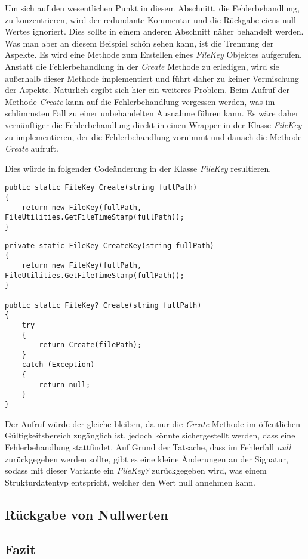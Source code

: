 Um sich auf den wesentlichen Punkt in diesem Abschnitt, die Fehlerbehandlung, zu konzentrieren, wird der redundante Kommentar und die Rückgabe eiens null-Wertes ignoriert. Dies sollte in einem anderen Abschnitt näher behandelt werden. %
Was man aber an diesem Beispiel schön sehen kann, ist die Trennung der Aspekte. Es wird eine Methode zum Erstellen eines \textit{FileKey} Objektes aufgerufen. Anstatt die Fehlerbehandlung in der \textit{Create} Methode zu erledigen, wird sie außerhalb dieser Methode implementiert und führt daher zu keiner Vermischung der Aspekte. Natürlich ergibt sich hier ein weiteres Problem. Beim Aufruf der Methode \textit{Create} kann auf die Fehlerbehandlung vergessen werden, was im schlimmsten Fall zu einer unbehandelten Ausnahme führen kann. Es wäre daher vernünftiger die Fehlerbehandlung direkt in einen Wrapper in der Klasse \textit{FileKey} zu implementieren, der die Fehlerbehandlung vornimmt und danach die Methode \textit{Create} aufruft.

Dies würde in folgender Codeänderung in der Klasse \textit{FileKey} resultieren.

\begin{lstlisting}[language={[Sharp]C}, caption=Fehlerbehandlung in der Klasse FileKey vorher, label=lst:AspectedErrorhandling]
public static FileKey Create(string fullPath)
{
	return new FileKey(fullPath, FileUtilities.GetFileTimeStamp(fullPath));
}
\end{lstlisting}

\begin{lstlisting}[language={[Sharp]C}, caption=Fehlerbehandlung in der Klasse FileKey nachher, label=lst:AspectedErrorhandling]
private static FileKey CreateKey(string fullPath)
{
	return new FileKey(fullPath, FileUtilities.GetFileTimeStamp(fullPath));
}
				
public static FileKey? Create(string fullPath)
{
	try
	{
		return Create(filePath);
	}
	catch (Exception)
	{
		return null;
	}
}
\end{lstlisting}

Der Aufruf würde der gleiche bleiben, da nur die \textit{Create} Methode im öffentlichen Gültigkeitsbereich zugänglich ist, jedoch könnte sichergestellt werden, dass eine Fehlerbehandlung stattfindet. Auf Grund der Tatsache, dass im Fehlerfall \textit{null} zurückgegeben werden sollte, gibt es eine kleine Änderungen an der Signatur, sodass mit dieser Variante ein \textit{FileKey?} zurückgegeben wird, was einem Strukturdatentyp entspricht, welcher den Wert null annehmen kann. 

\subsection{Rückgabe von Nullwerten}


\subsection{Fazit}
